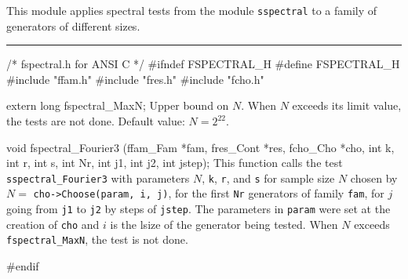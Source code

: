 
This module applies spectral tests from the module {\tt sspectral}
to a family of generators of different sizes.

\bigskip
\hrule
\code\hide
/* fspectral.h  for ANSI C */
#ifndef FSPECTRAL_H
#define FSPECTRAL_H
\endhide
#include "ffam.h"
#include "fres.h"
#include "fcho.h"


extern long fspectral_MaxN;
\endcode
\tab
  Upper bound on $N$.
  When $N$ exceeds its limit value, the tests are not done.
  Default value: $N = 2^{22}$.
\endtab




\code
void fspectral_Fourier3 (ffam_Fam *fam, fres_Cont *res, fcho_Cho *cho,
                         int k, int r, int s,
                         int Nr, int j1, int j2, int jstep);
\endcode
\tab
 This function calls the test {\tt sspectral\_Fourier3} with parameters
 $N$, {\tt k}, {\tt r}, and {\tt s} for sample size $N$ chosen by
  $N = {}$ {\tt cho->Choose(param, i, j)},
 for the first {\tt Nr} generators of family {\tt fam}, for $j$ going from
 {\tt j1} to {\tt j2} by steps of {\tt jstep}. The parameters in {\tt param}
 were set at the creation of {\tt cho} and $i$ is the lsize of the
 generator being tested.
 When $N$ exceeds {\tt fspectral\_MaxN}, the test is not done.
\endtab

\code
\hide
#endif
\endhide
\endcode
